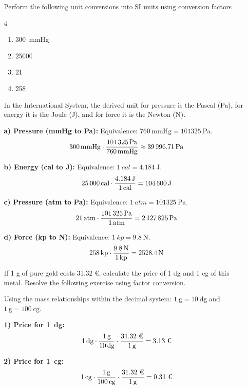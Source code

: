 \begin{exercise}
    Perform the following unit conversions into SI units using conversion factors
    \begin{multicols}{4}
        \begin{enumerate}[label=\letraminuscula]
\item \qty{300}{\mmHg}
\item \qty{25000}{\cal}
\item \qty{21}{\atmosphere}
\item \qty{258}{\kilopondio}
        \end{enumerate}
    \end{multicols}


    \begin{solu}
        In the International System, the derived unit for pressure is the Pascal (\unit{\Pa}), for energy it is the Joule (\unit{\J}), and for force it is the Newton (\unit{\N}).

        \textbf{a) Pressure (\unit{\mmHg} to \unit{\Pa}):}
        Equivalence: \( \qty{760}{\mmHg} = \qty{101325}{\Pa} \).
        \[ \qty{300}{\cancel{\mmHg}} \cdot \frac{\qty{101325}{\Pa}}{\qty{760}{\cancel{\mmHg}}} \approx \qty{39996.71}{\Pa} \]

        \textbf{b) Energy (\unit{cal} to \unit{\J}):}
        Equivalence: \( \qty{1}{cal} = \qty{4.184}{\J} \).
        \[ \qty{25000}{\cancel{cal}} \cdot \frac{\qty{4.184}{\J}}{\qty{1}{\cancel{cal}}} = \qty{104600}{\J} \]

        \textbf{c) Pressure (\unit{atm} to \unit{\Pa}):}
        Equivalence: \( \qty{1}{atm} = \qty{101325}{\Pa} \).
        \[ \qty{21}{\cancel{atm}} \cdot \frac{\qty{101325}{\Pa}}{\qty{1}{\cancel{atm}}} = \qty{2127825}{\Pa} \]

        \textbf{d) Force (\unit{kp} to \unit{\N}):}
        Equivalence: \( \qty{1}{kp} = \qty{9.8}{\N} \).
        \[ \qty{258}{\cancel{kp}} \cdot \frac{\qty{9.8}{\N}}{\qty{1}{\cancel{kp}}} = \qty{2528.4}{\N} \]
    \end{solu}

\end{exercise}

\begin{exercise}
    If 1 g of pure gold costs 31.32 €, calculate the price of 1 dg and 1 cg of this metal. Resolve the following exercise using factor conversion.

    \begin{solu}
        Using the mass relationships within the decimal system: \( \qty{1}{\g} = \qty{10}{\deci\g} \) and \( \qty{1}{\g} = \qty{100}{\centi\g} \).

        \textbf{1) Price for \qty{1}{\deci\g}:}
        \[ \qty{1}{\cancel{\deci\g}} \cdot \frac{\qty{1}{\cancel{\g}}}{\qty{10}{\cancel{\deci\g}}} \cdot \frac{\text{31.32 €}}{\qty{1}{\cancel{\g}}} = \text{3.13 €} \]

        \textbf{2) Price for \qty{1}{\centi\g}:}
        \[ \qty{1}{\cancel{\centi\g}} \cdot \frac{\qty{1}{\cancel{\g}}}{\qty{100}{\cancel{\centi\g}}} \cdot \frac{\text{31.32 €}}{\qty{1}{\cancel{\g}}} = \text{0.31 €} \]
    \end{solu}

\end{exercise}

